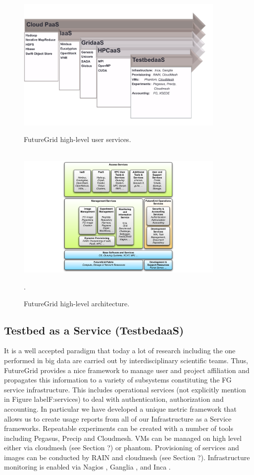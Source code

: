 \documentclass{article}
\begin{document}
\begin{figure}[p]
  \centering
    \includegraphics[width=0.9\textwidth]{images/user-services.pdf}
  \caption{FutureGrid high-level user services.}\label{F:services}
  ~\\
  \centering
  \includegraphics[width=0.9\textwidth]{images/architecture.pdf}
  \caption{FutureGrid high-level architecture.}\label{F:arch}.
\end{figure}

\subsection{Testbed as a Service (TestbedaaS)}

It is a well accepted paradigm that today a lot of research including the one performed in big data are carried out by interdisciplinary scientific teams. Thus, FutureGrid provides a nice framework to manage user and project affiliation and propagates this information to a variety of subsystems constituting the FG service infrastructure. This includes operational services (not explicitly mention in Figure label{F:services}) to deal with authentication, authorization and accounting. In particular we have developed a unique metric framework that allows us to create usage reports from all of our Infrastructure as a Service frameworks. Repeatable experiments can be created with a number of tools including Pegasus, Precip and Cloudmesh. VMs can be managed on high level either via cloudmesh (see Section ?) or phantom. Provisioning of services and images can be conducted by RAIN \cite{?} and cloudmesh (see Section ?). Infrastructure monitoring is enabled via Nagios \cite{nagios}, Ganglia \cite{ganglia}, and Inca \cite{inca}.
\end{document}
